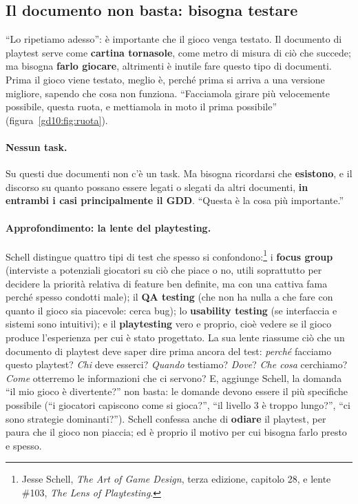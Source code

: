 \subsection{Il documento non basta: bisogna testare}

``Lo ripetiamo adesso'': è importante che il gioco venga testato. Il
documento di playtest serve come \textbf{cartina tornasole}, come metro di
misura di ciò che succede; ma bisogna \textbf{farlo giocare}, altrimenti è
inutile fare questo tipo di documenti. Prima il gioco viene testato, meglio
è, perché prima si arriva a una versione migliore, sapendo che cosa non
funziona. ``Facciamola girare più velocemente possibile, questa ruota, e
mettiamola in moto il prima possibile'' (figura~\ref{gd10:fig:ruota}).

\paragraph{Nessun task.} Su questi due documenti non c'è un task. Ma bisogna
ricordarsi che \textbf{esistono}, e il discorso su quanto possano essere
legati o slegati da altri documenti, \textbf{in entrambi i casi
principalmente il GDD}. ``Questa è la cosa più importante.''

\paragraph{Approfondimento: la lente del playtesting.} Schell distingue
quattro tipi di test che spesso si confondono:\footnote{Jesse Schell,
\emph{The Art of Game Design}, terza edizione, capitolo 28, e lente \#103,
\emph{The Lens of Playtesting}.} i \textbf{focus group} (interviste a
potenziali giocatori su ciò che piace o no, utili soprattutto per decidere la
priorità relativa di feature ben definite, ma con una cattiva fama perché
spesso condotti male); il \textbf{QA testing} (che non ha nulla a che fare
con quanto il gioco sia piacevole: cerca bug); lo \textbf{usability testing}
(se interfaccia e sistemi sono intuitivi); e il \textbf{playtesting} vero e
proprio, cioè vedere se il gioco produce l'esperienza per cui è stato
progettato. La sua lente riassume ciò che un documento di playtest deve
saper dire prima ancora del test: \emph{perché} facciamo questo playtest?
\emph{Chi} deve esserci? \emph{Quando} testiamo? \emph{Dove}? \emph{Che
cosa} cerchiamo? \emph{Come} otterremo le informazioni che ci servono? E,
aggiunge Schell, la domanda ``il mio gioco è divertente?'' non basta: le
domande devono essere il più specifiche possibile (``i giocatori capiscono
come si gioca?'', ``il livello 3 è troppo lungo?'', ``ci sono strategie
dominanti?''). Schell confessa anche di \textbf{odiare} il playtest, per
paura che il gioco non piaccia; ed è proprio il motivo per cui bisogna farlo
presto e spesso.

